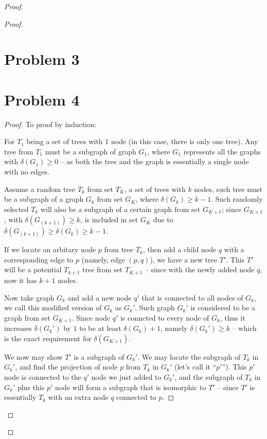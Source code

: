 \documentclass[12pt]{article}
\begin{document}
\begin{proof}
\begin{proof}
\section{Problem 3}




\section{Problem 4}


\begin{proof}
To proof by induction: \newline

For $T_1$ being a set of trees with $1$ node (in this case, there is only one tree). Any tree from $T_1$ must be a subgraph of graph $G_1$, where $G_1$ represents all the graphs with $\delta(G_1) \geq 0$ -- as both the tree and the graph is essentially a single node with no edges. \newline

Assume a random tree $T_k$ from set $T_K$, a set of trees with $k$ nodes, such tree must be a subgraph of a graph $G_k$ from set $G_K$, where $\delta(G_k) \geq k - 1$. Such randomly selected $T_k$ will also be a subgraph of a certain graph from set $G_{K+1}$; since $G_{K+1}$, with $\delta(G_(k+1)) \geq k$, is included in set $G_K$ due to $\delta(G_(k+1)) \geq \delta(G_k) \geq k - 1$.\newline

If we locate an arbitary node $p$ from tree $T_{k}$, then add a child node $q$ with a corresponding edge to $p$  (namely, edge $(p, q)$), we have a new tree $T'$. This $T'$ will be a potential $T_{k+1}$ tree from set $T_{K+1}$ -- since with the newly added node $q$, now it has $k+1$ nodes.

Now take graph $G_k$ and add a new node $q'$ that is connected to all nodes of $G_k$, we call this modified version of $G_k$ as $G_k'$. Such graph $G_k'$ is considered to be a graph from set $G_{K+1}$. Since node $q'$ is conncted to every node of $G_k$, thus it increases $\delta(G_k')$ by $1$ to be at least $\delta(G_k) + 1$, namely $\delta(G_k') \geq k$ -- which is the exact requirement for $\delta(G_{K+1})$.\newline

We now may show $T'$ is a subgraph of $G_k'$. We may locate the subgraph of $T_k$ in $G_k'$, and find the projection of node $p$ from $T_k$ in $G_k'$ (let's call it ``$p'$''). This $p'$ node is connected to the $q'$ node we just added to $G_k'$, and the subgraph of $T_k$ in $G_k'$ plus this $p'$ node will form a subgraph that is isomorphic to $T'$ -- since $T'$ is essentially $T_k$ with an extra node $q$ connected to $p$.


\end{proof}
\end{proof}
\end{proof}
\end{document}
